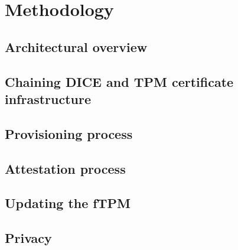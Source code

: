 
\chapter{Methodology}\label{chapter:methodology}

\section{Architectural overview}



\section{Chaining DICE and TPM certificate infrastructure}

\section{Provisioning process}


\section{Attestation process}


\section{Updating the fTPM}


\section{Privacy}

